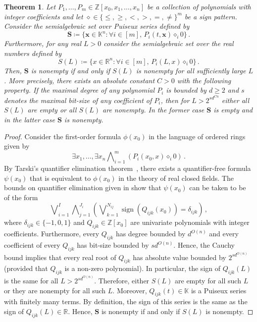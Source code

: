 \documentclass[11pt]{article}
\newtheorem{theorem}{Theorem}[section]
\theoremstyle{definition}
\theoremstyle{remark}
\newcommand{\R}{\mathbb{R}}
\newcommand{\Z}{\mathbb{Z}}
\newcommand{\puiseux}{\mathbb{K}}
\DeclareMathOperator*{\sign}{\mathrm{sign}}
\DeclareMathOperator*{\bigland}{\bigwedge}
\DeclareMathOperator*{\biglor}{\bigvee}
\begin{document}
\begin{theorem}\label{real_parameter}
Let $P_1, \dots, P_m \in \Z[x_0,x_1, \dots, x_n]$ be a collection of polynomials with integer coefficients and let $\diamond \in \{\le,\ge,<,>,=, \neq\}^m$ be a sign pattern. Consider the semialgebraic set over Puiseux series defined by 
\[
\bm{S} \coloneqq \{\bm{x} \in \puiseux^n \colon \forall i \in [m], \, P_i(t,\bm{x}) \diamond_i 0\} \, .
\]
Furthermore, for any real $L > 0$ consider the semialgebraic set over the real numbers defined by 
\[
S(L) \coloneqq \{x \in \R^n \colon \forall i \in [m], \, P_i(L,x) \diamond_i 0\} \, .
\]
Then, $\bm{S}$ is nonempty if and only if $S(L)$ is nonempty for all sufficiently large $L$. More precisely, there exists an absolute constant $C > 0$ with the following property. If 
the maximal degree of any polynomial $P_i$ is bounded by $d \ge 2$ 
and $s$ denotes the maximal bit-size of any coefficient of $P_i$, then for $L > 2^{sd^{Cn}}$ either all $S(L)$ are empty or all $S(L)$ are nonempty. In the former case $\bm{S}$ is empty and in the latter case $\bm{S}$ is nonempty.
\end{theorem}
\begin{proof}
Consider the first-order formula $\phi(x_0)$ in the language of ordered rings given by
\[
\exists x_1, \dots, \exists x_n \bigland_{i = 1}^{m}(P_i(x_0,x) \diamond_i 0) \, .
\]
By Tarski's quantifier elimination theorem~\cite[Theorem~2.77]{basu_pollack_roy_algorithms}, there exists a quantifier-free formula $\psi(x_0)$ that is equivalent to $\phi(x_0)$ in the theory of real closed fields. The bounds on quantifier elimination given in \cite[Theorem~14.6]{basu_pollack_roy_algorithms} show that $\psi(x_0)$ can be taken to be of the form
\[
\biglor_{i = 1}^{I} \bigland_{j = 1}^{J_i} \left (\biglor_{k = 1}^{N_{ij}} \sign(Q_{ijk}(x_0)) = \delta_{ijk} \right ) \, ,
\]
where $\delta_{ijk} \in \{-1,0,1\}$ and $Q_{ijk} \in \Z[x_0]$ are univariate polynomials with integer coefficients. Furthermore, every $Q_{ijk}$ has degree bounded by $d^{O(n)}$ and every coefficient of every $Q_{ijk}$ has bit-size bounded by $sd^{O(n)}$. Hence, the Cauchy bound \cite[Corollary~10.4]{basu_pollack_roy_algorithms} implies that every real root of $Q_{ijk}$ has absolute value bounded by $2^{sd^{O(n)}}$ (provided that $Q_{ijk}$ is a non-zero polynomial). In particular, the sign of $Q_{ijk}(L)$ is the same for all $L > 2^{sd^{O(n)}}$. Therefore, either $S(L)$ are empty for all such $L$ or they are nonempty for all such $L$. Moreover,  $Q_{ijk}(t) \in \puiseux$ is a Puiseux series with finitely many terms. By definition, the sign of this series is the same as the sign of $Q_{ijk}(L) \in \R$.
Hence, $\bm{S}$ is nonempty if and only if $S(L)$ is nonempty.
\end{proof}
\end{document}
